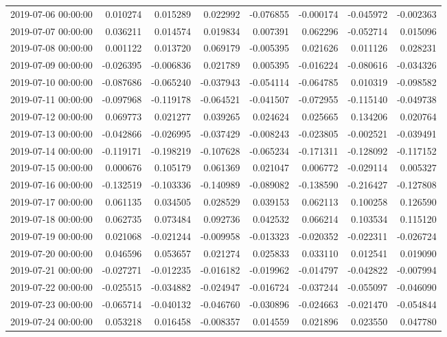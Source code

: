 \begin{tabular}{lrrrrrrr}
2019-07-06 00:00:00 & 0.010274 & 0.015289 & 0.022992 & -0.076855 & -0.000174 & -0.045972 & -0.002363 \\
2019-07-07 00:00:00 & 0.036211 & 0.014574 & 0.019834 & 0.007391 & 0.062296 & -0.052714 & 0.015096 \\
2019-07-08 00:00:00 & 0.001122 & 0.013720 & 0.069179 & -0.005395 & 0.021626 & 0.011126 & 0.028231 \\
2019-07-09 00:00:00 & -0.026395 & -0.006836 & 0.021789 & 0.005395 & -0.016224 & -0.080616 & -0.034326 \\
2019-07-10 00:00:00 & -0.087686 & -0.065240 & -0.037943 & -0.054114 & -0.064785 & 0.010319 & -0.098582 \\
2019-07-11 00:00:00 & -0.097968 & -0.119178 & -0.064521 & -0.041507 & -0.072955 & -0.115140 & -0.049738 \\
2019-07-12 00:00:00 & 0.069773 & 0.021277 & 0.039265 & 0.024624 & 0.025665 & 0.134206 & 0.020764 \\
2019-07-13 00:00:00 & -0.042866 & -0.026995 & -0.037429 & -0.008243 & -0.023805 & -0.002521 & -0.039491 \\
2019-07-14 00:00:00 & -0.119171 & -0.198219 & -0.107628 & -0.065234 & -0.171311 & -0.128092 & -0.117152 \\
2019-07-15 00:00:00 & 0.000676 & 0.105179 & 0.061369 & 0.021047 & 0.006772 & -0.029114 & 0.005327 \\
2019-07-16 00:00:00 & -0.132519 & -0.103336 & -0.140989 & -0.089082 & -0.138590 & -0.216427 & -0.127808 \\
2019-07-17 00:00:00 & 0.061135 & 0.034505 & 0.028529 & 0.039153 & 0.062113 & 0.100258 & 0.126590 \\
2019-07-18 00:00:00 & 0.062735 & 0.073484 & 0.092736 & 0.042532 & 0.066214 & 0.103534 & 0.115120 \\
2019-07-19 00:00:00 & 0.021068 & -0.021244 & -0.009958 & -0.013323 & -0.020352 & -0.022311 & -0.026724 \\
2019-07-20 00:00:00 & 0.046596 & 0.053657 & 0.021274 & 0.025833 & 0.033110 & 0.012541 & 0.019090 \\
2019-07-21 00:00:00 & -0.027271 & -0.012235 & -0.016182 & -0.019962 & -0.014797 & -0.042822 & -0.007994 \\
2019-07-22 00:00:00 & -0.025515 & -0.034882 & -0.024947 & -0.016724 & -0.037244 & -0.055097 & -0.046090 \\
2019-07-23 00:00:00 & -0.065714 & -0.040132 & -0.046760 & -0.030896 & -0.024663 & -0.021470 & -0.054844 \\
2019-07-24 00:00:00 & 0.053218 & 0.016458 & -0.008357 & 0.014559 & 0.021896 & 0.023550 & 0.047780 \\

\end{tabular}
